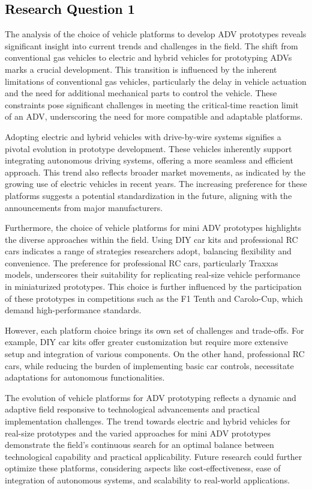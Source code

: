 \documentclass[lettersize,journal]{IEEEtran}
\begin{document}
\subsection{\textcolor{black}{\textbf{Research Question 1}}}
The analysis of the choice of vehicle platforms to develop ADV prototypes reveals significant insight into current trends and challenges in the field. The shift from conventional gas vehicles to electric and hybrid vehicles for prototyping ADVs marks a crucial development. This transition is influenced by the inherent limitations of conventional gas vehicles, particularly the delay in vehicle actuation and the need for additional mechanical parts to control the vehicle. These constraints pose significant challenges in meeting the critical-time reaction limit of an ADV, underscoring the need for more compatible and adaptable platforms.

Adopting electric and hybrid vehicles with drive-by-wire systems signifies a pivotal evolution in prototype development. These vehicles inherently support integrating autonomous driving systems, offering a more seamless and efficient approach. This trend also reflects broader market movements, as indicated by the growing use of electric vehicles in recent years. The increasing preference for these platforms suggests a potential standardization in the future, aligning with the announcements from major manufacturers.

Furthermore, the choice of vehicle platforms for mini ADV prototypes highlights the diverse approaches within the field. Using DIY car kits and professional RC cars indicates a range of strategies researchers adopt, balancing flexibility and convenience. The preference for professional RC cars, particularly Traxxas models, underscores their suitability for replicating real-size vehicle performance in miniaturized prototypes. This choice is further influenced by the participation of these prototypes in competitions such as the F1 Tenth and Carolo-Cup, which demand high-performance standards.

However, each platform choice brings its own set of challenges and trade-offs. For example, DIY car kits offer greater customization but require more extensive setup and integration of various components. On the other hand, professional RC cars, while reducing the burden of implementing basic car controls, necessitate adaptations for autonomous functionalities.

The evolution of vehicle platforms for ADV prototyping reflects a dynamic and adaptive field responsive to technological advancements and practical implementation challenges. The trend towards electric and hybrid vehicles for real-size prototypes and the varied approaches for mini ADV prototypes demonstrate the field’s continuous search for an optimal balance between technological capability and practical applicability. Future research could further optimize these platforms, considering aspects like cost-effectiveness, ease of integration of autonomous systems, and scalability to real-world applications.
\\
\end{document}
